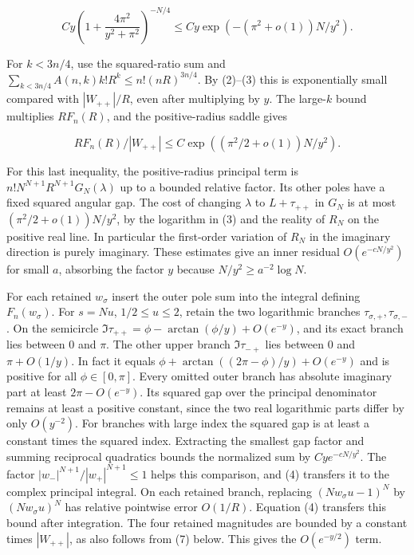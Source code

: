 \documentclass[11pt]{article}
\begin{document}
\[
Cy\left(1+\frac{4\pi^2}{y^2+\pi^2}\right)^{-N/4}
\le Cy\exp(-(\pi^2+o(1))N/y^2).
\]

For $k<3n/4$, use the squared-ratio sum and $\sum_{k<3n/4} A(n,k)k!R^k\le n!(nR)^{3n/4}$. By (2)--(3) this is exponentially small compared with $|W_{++}|/R$, even after multiplying by $y$. The large-$k$ bound multiplies $R F_n(R)$, and the positive-radius saddle gives

\[
R F_n(R)/|W_{++}|\le C\exp((\pi^2/2+o(1))N/y^2).
\]

For this last inequality, the positive-radius principal term is $n!N^{N+1}R^{N+1}G_N(\lambda)$ up to a bounded relative factor. Its other poles have a fixed squared angular gap. The cost of changing $\lambda$ to $L+\tau_{++}$ in $G_N$ is at most $(\pi^2/2+o(1))N/y^2$, by the logarithm in (3) and the reality of $R_N$ on the positive real line. In particular the first-order variation of $R_N$ in the imaginary direction is purely imaginary. These estimates give an inner residual $O(e^{-cN/y^2})$ for small $a$, absorbing the factor $y$ because $N/y^2\ge a^{-2}\log N$.

For each retained $w_\sigma$ insert the outer pole sum into the integral defining $F_n(w_\sigma)$. For $s=Nu$, $1/2\le u\le2$, retain the two logarithmic branches $\tau_{\sigma,+},\tau_{\sigma,-}$. On the semicircle $\Im\tau_{++}=\phi-\arctan(\phi/y)+O(e^{-y})$, and its exact branch lies between $0$ and $\pi$. The other upper branch $\Im\tau_{-+}$ lies between $0$ and $\pi+O(1/y)$. In fact it equals $\phi+\arctan((2\pi-\phi)/y)+O(e^{-y})$ and is positive for all $\phi\in[0,\pi]$. Every omitted outer branch has absolute imaginary part at least $2\pi-O(e^{-y})$. Its squared gap over the principal denominator remains at least a positive constant, since the two real logarithmic parts differ by only $O(y^{-2})$. For branches with large index the squared gap is at least a constant times the squared index. Extracting the smallest gap factor and summing reciprocal quadratics bounds the normalized sum by $Cy e^{-cN/y^2}$. The factor $|w_-|^{N+1}/|w_+|^{N+1}\le1$ helps this comparison, and (4) transfers it to the complex principal integral. On each retained branch, replacing $(Nw_\sigma u-1)^N$ by $(Nw_\sigma u)^N$ has relative pointwise error $O(1/R)$. Equation (4) transfers this bound after integration. The four retained magnitudes are bounded by a constant times $|W_{++}|$, as also follows from (7) below. This gives the $O(e^{-y/2})$ term.
\end{document}
